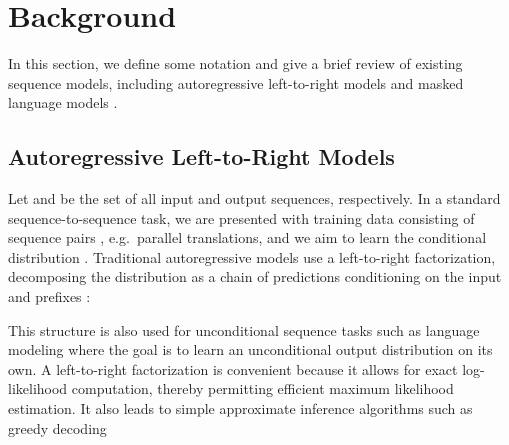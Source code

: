\documentclass{article}
\begin{document}
\begin{table}[t]
\small
\centering
{} \caption{The KERMIT architecture works well for three categories of tasks: machine translation, representation learning, and zero-shot cloze question answering. \citet{vaswani-nips-2017} \citet{radford-openai-2018} \citet{devlin-naacl-2019}}
\label{tab:comparison}
\end{table} \section{Background}
\label{sec:background}

In this section, we define some notation and give a brief review of existing sequence models, including autoregressive left-to-right models \citep{sutskever-nips-2014,cho-emnlp-2014} and masked language models \citep{devlin-naacl-2019}.

\subsection{Autoregressive Left-to-Right Models}
Let  and  be the set of all input and output sequences, respectively. In a standard sequence-to-sequence task, we are presented with training data consisting of sequence pairs , e.g.\ parallel translations, and we aim to learn the conditional distribution .
Traditional autoregressive models \citep{sutskever-nips-2014,cho-emnlp-2014} use a left-to-right factorization, decomposing the distribution as a chain of predictions conditioning on the input  and prefixes :

This structure is also used for unconditional sequence tasks such as language modeling where the goal is to learn an unconditional output distribution on its own. A left-to-right factorization is convenient because it allows for exact log-likelihood computation, thereby permitting efficient maximum likelihood estimation.
It also leads to simple approximate inference algorithms such as greedy decoding
\end{document}
